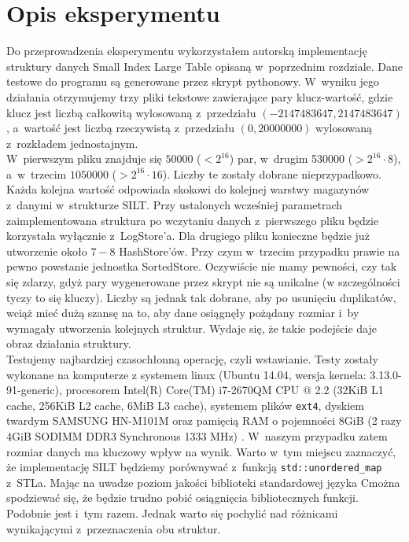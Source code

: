\documentclass[declaration,shortabstract,masc]{iithesis}
\newcommand{\cpp}{C\raisebox{0.5ex}{{\tiny\textbf{++}}}}
\begin{document}
		\section{Opis eksperymentu}
			Do przeprowadzenia eksperymentu wykorzystałem autorską implementację\linebreak
			struktury danych Small Index Large Table opisaną w~poprzednim rozdziale. Dane testowe do programu są generowane przez skrypt pythonowy. W~wyniku jego działania otrzymujemy trzy pliki tekstowe zawierające pary klucz-wartość, gdzie klucz jest liczbą całkowitą wylosowaną z~przedziału $(-2147483647, 2147483647)$, a~wartość jest liczbą rzeczywistą z~przedziału $(0, 20000000)$ wylosowaną z~rozkładem jednostajnym.\\
			\indent W~pierwszym pliku znajduje się $50000$ ($< 2^{16}$) par, w~drugim 530000 ($> 2^{16}\cdot 8$), a~w~trzecim $1050000$ ($> 2^{16}\cdot 16$). Liczby te zostały dobrane nieprzypadkowo. Każda kolejna wartość odpowiada skokowi do kolejnej warstwy magazynów z~danymi w~strukturze SILT. Przy ustalonych wcześniej parametrach zaimplementowana struktura po wczytaniu danych z~pierwszego pliku będzie korzystała wyłącznie z~LogStore'a. Dla drugiego pliku konieczne będzie już utworzenie około $7-8$ HashStore'ów. Przy czym w~trzecim przypadku prawie na pewno powstanie jednostka SortedStore. Oczywiście nie mamy pewności, czy tak się zdarzy, gdyż pary wygenerowane przez skrypt nie są unikalne (w szczególności tyczy to się kluczy). Liczby są jednak tak dobrane, aby po usunięciu duplikatów, wciąż mieć dużą szansę na to, aby dane osiągnęły pożądany rozmiar i~by wymagały utworzenia kolejnych struktur. Wydaje się, że takie podejście daje obraz działania struktury.\\
			\indent Testujemy najbardziej czasochłonną operację, czyli wstawianie. Testy zostały wykonane na komputerze z systemem linux (Ubuntu 14.04, wersja kernela: 3.13.0-91-generic), procesorem Intel(R) Core(TM) i7-2670QM CPU @ 2.2 (32KiB L1 cache, 256KiB L2 cache, 6MiB L3 cache), systemem plików \texttt{ext4}, dyskiem twardym SAMSUNG HN-M101M oraz pamięcią RAM o pojemności 8GiB (2 razy 4GiB SODIMM DDR3 Synchronous 1333 MHz) . W~naszym przypadku zatem rozmiar danych ma kluczowy wpływ na wynik. Warto w~tym miejscu zaznaczyć, że implementację SILT będziemy porównywać z~funkcją \texttt{std::unordered\_map} z~STLa. Mając na uwadze poziom jakości biblioteki standardowej języka \cpp można spodziewać się, że będzie trudno pobić osiągnięcia bibliotecznych funkcji. Podobnie jest i~tym razem. Jednak warto się pochylić nad różnicami wynikającymi z~przeznaczenia obu struktur.\\
\end{document}
